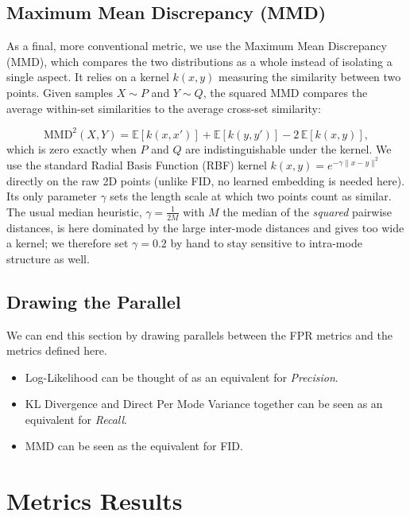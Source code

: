 \subsection{Maximum Mean Discrepancy (MMD)}

As a final, more conventional metric, we use the Maximum Mean Discrepancy (\acs{MMD}), which compares the two distributions as a whole instead of isolating a single aspect. It relies on a kernel $k(x,y)$ measuring the similarity between two points. Given samples $X \sim P$ and $Y \sim Q$, the squared \acs{MMD} compares the average within-set similarities to the average cross-set similarity:

\begin{equation}
\text{MMD}^2(X, Y) = \mathbb{E}[k(x, x')] + \mathbb{E}[k(y, y')] - 2\,\mathbb{E}[k(x, y)],
\end{equation}
which is zero exactly when $P$ and $Q$ are indistinguishable under the kernel. We use the standard Radial Basis Function (RBF) kernel $k(x,y) = e^{-\gamma \|x-y\|^2}$ directly on the raw 2D points (unlike \acs{FID}, no learned embedding is needed here). Its only parameter $\gamma$ sets the length scale at which two points count as similar. The usual median heuristic, $\gamma = \tfrac{1}{2M}$ with $M$ the median of the \emph{squared} pairwise distances, is here dominated by the large inter-mode distances and gives too wide a kernel; we therefore set $\gamma = 0.2$ by hand to stay sensitive to intra-mode structure as well.

\subsection{Drawing the Parallel}

We can end this section by drawing parallels between the \acs{FPR} metrics and the metrics defined here.
\begin{itemize}
    \item Log-Likelihood can be thought of as an equivalent for \emph{Precision}.
    \item KL Divergence and Direct Per Mode Variance together can be seen as an equivalent for \emph{Recall}.
    \item \acs{MMD} can be seen as the equivalent for \acs{FID}.
\end{itemize}

\section{Metrics Results}

